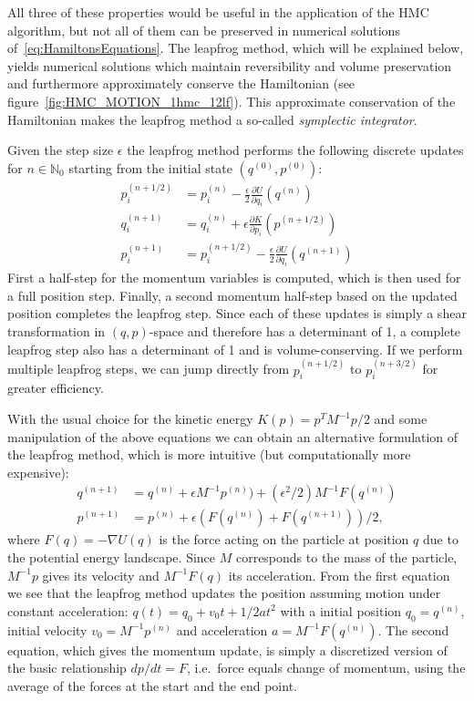 All three of these properties would be useful in the application of the HMC algorithm, but not all of them can be preserved in numerical solutions of~\eqref{eq:HamiltonsEquations}. The leapfrog method, which will be explained below, yields numerical solutions which maintain reversibility and volume preservation and furthermore approximately conserve the Hamiltonian (see figure~\ref{fig:HMC_MOTION_1hmc_12lf}). This approximate conservation of the Hamiltonian makes the leapfrog method a so-called \textit{symplectic integrator}.

Given the step size $\epsilon$ the leapfrog method performs the following discrete updates for $n \in \mathbb{N}_0$ starting from the initial state $(q^{(0)}, p^{(0)})$:
\begin{equation}
\begin{split}
p_i^{(n + 1/2)} &= p_i^{(n)} - \frac{\epsilon}{2} \frac{\partial U}{\partial q_i}(q^{(n)}) \\
q_i^{(n + 1)} &= q_i^{(n)} + \epsilon \frac{\partial K}{\partial p_i}(p^{(n + 1/2)}) \\
p_i^{(n + 1)} &= p_i^{(n + 1/2)} - \frac{\epsilon}{2} \frac{\partial U}{\partial q_i}(q^{(n + 1)})
\end{split}
\end{equation}
First a half-step for the momentum variables is computed, which is then used for a full position step. Finally, a second momentum half-step based on the updated position completes the leapfrog step. Since each of these updates is simply a shear transformation in $(q, p)$-space and therefore has a determinant of 1, a complete leapfrog step also has a determinant of 1 and is volume-conserving. If we perform multiple leapfrog steps, we can jump directly from $p_i^{(n + 1/2)}$ to $p_i^{(n + 3/2)}$ for greater efficiency.

With the usual choice for the kinetic energy $K(p) = p^T M^{-1} p /2$ and some manipulation of the above equations we can obtain an alternative formulation of the leapfrog method, which is more intuitive (but computationally more expensive):
\begin{equation}
\begin{split}
q^{(n + 1)} &= q^{(n)} + \epsilon M^{-1} p^{(n)}) + (\epsilon^2/2) M^{-1} F(q^{(n)}) \\
p^{(n + 1)} &= p^{(n)} + \epsilon (F(q^{(n)}) + F(q^{(n+1)}))/2,
\end{split}
\end{equation}
where $F(q) = - \nabla U(q)$ is the force acting on the particle at position $q$ due to the potential energy landscape. Since $M$ corresponds to the mass of the particle, $M^{-1} p$ gives its velocity and $M^{-1} F(q)$ its acceleration. From the first equation we see that the leapfrog method updates the position assuming motion under constant acceleration: $q(t) = q_0 + v_0 t + 1/2 a t^2$ with a initial position $q_0 = q^{(n)}$, initial velocity $v_0 = M^{-1} p^{(n)}$ and acceleration $a = M^{-1} F(q^{(n)})$. The second equation, which gives the momentum update, is simply a discretized version of the basic relationship $dp/dt = F$, i.e.\ force equals change of momentum, using the average of the forces at the start and the end point.

